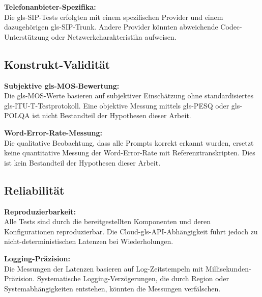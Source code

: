 \textbf{Telefonanbieter-Spezifika:}\\
Die \gls{gls-SIP}-Tests erfolgten mit einem spezifischen Provider und einem dazugehörigen \gls{gls-SIP}-Trunk. Andere Provider könnten abweichende Codec-Unterstützung oder Netzwerkcharakteristika aufweisen.

\subsection{Konstrukt-Validität}
\textbf{Subjektive \gls{gls-MOS}-Bewertung:}\\
Die \gls{gls-MOS}-Werte basieren auf subjektiver Einschätzung ohne standardisiertes \gls{gls-ITU-T}-Testprotokoll. Eine objektive Messung mittels \gls{gls-PESQ} oder \gls{gls-POLQA} ist nicht Bestandteil der Hypothesen dieser Arbeit.

\textbf{Word-Error-Rate-Messung:}\\
Die qualitative Beobachtung, dass alle Prompts korrekt erkannt wurden, ersetzt keine quantitative Messung der Word-Error-Rate mit Referenztranskripten. Dies ist kein Bestandteil der Hypothesen dieser Arbeit.

\subsection{Reliabilität}
\textbf{Reproduzierbarkeit:}\\
Alle Tests sind durch die bereitgestellten Komponenten und deren Konfigurationen reproduzierbar. Die Cloud-\gls{gls-API}-Abhängigkeit führt jedoch zu nicht-deterministischen Latenzen bei Wiederholungen.

\textbf{Logging-Präzision:}\\
Die Messungen der Latenzen basieren auf Log-Zeitstempeln mit Millisekunden-Präzision. Systematische Logging-Verzögerungen, die durch Region oder Systemabhängigkeiten entstehen, könnten die Messungen verfälschen.